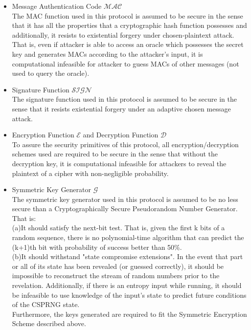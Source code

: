 \begin{itemize}
\item Message Authentication Code $\mathcal{MAC}$\\
The MAC \cite{RFC2104} function used in this protocol is assumed to be secure in the sense that it has all the properties that a cryptographic hash function possesses and additionally, it resists to existential forgery under chosen-plaintext attack. That is, even if attacker is able to access an oracle which possesses the secret key and generates MACs according to the attacker's input, it is computational infeasible for attacker to guess MACs of other messages (not used to query the oracle).

\item Signature Function $\mathcal{SIGN}$\\
The signature function used in this protocol is assumed to be secure in the sense that it resists existential forgery under an adaptive chosen message attack. \cite{Goldwasser}\cite{Mao}

\item Encryption Function $\mathcal{E}$ and Decryption Function $\mathcal{D}$\\
To assure the security primitives of this protocol, all encryption/decryption schemes used are required to be secure in the sense that without the decryption key, it is computational infeasible for attackers to reveal the plaintext of a cipher with non-negligible probability.

\item Symmetric Key Generator $\mathcal{G}$\\
The symmetric key generator used in this protocol is assumed to be no less secure than a Cryptographically Secure Pseudorandom Number Generator. That is: \\
(a)It should satisfy the next-bit test. That is, given the first k bits of a random sequence, there is no polynomial-time algorithm that can predict the (k+1)th bit with probability of success better than 50\%. \cite{Yao}\\
(b)It should withstand "state compromise extensions". In the event that part or all of its state has been revealed (or guessed correctly), it should be impossible to reconstruct the stream of random numbers prior to the revelation. Additionally, if there is an entropy input while running, it should be infeasible to use knowledge of the input's state to predict future conditions of the CSPRNG state.\\
Furthermore, the keys generated are required to fit the Symmetric Encryption Scheme described above.
\\
\end{itemize}


